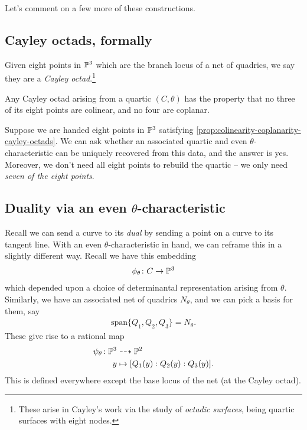 \documentclass[11pt]{amsart}
\begin{document}
Let's comment on a few more of these constructions.


\subsection{Cayley octads, formally}

\begin{definition}
Given eight points in $\P^3$ which are the branch locus of a net of quadrics, we say they are a \textit{Cayley octad}.\footnote{These arise in Cayley's work via the study of \textit{octadic surfaces}, being quartic surfaces with eight nodes.}
\end{definition}


\begin{proposition}
\label{prop:colinearity-coplanarity-cayley-octads}
Any Cayley octad arising from a quartic $(C,\theta)$ has the property that no three of its eight points are colinear, and no four are coplanar.
\end{proposition}

Suppose we are handed eight points in $\P^3$ satisfying \autoref{prop:colinearity-coplanarity-cayley-octads}. We can ask whether an associated quartic and even $\theta$-characteristic can be uniquely recovered from this data, and the answer is yes. Moreover, we don't need all eight points to rebuild the quartic -- we only need \textit{seven of the eight points}.

\subsection{Duality via an even \texorpdfstring{$\theta$}{theta}-characteristic}

Recall we can send a curve to its \textit{dual} by sending a point on a curve to its tangent line. With an even $\theta$-characteristic in hand, we can reframe this in a slightly different way. Recall we have this embedding
\begin{align*}
    \phi_\theta \colon C \to \P^3
\end{align*}
which depended upon a choice of determinantal representation arising from $\theta$. Similarly, we have an associated net of quadrics $N_\theta$, and we can pick a basis for them, say
\begin{align*}
    \text{span}\{Q_1,Q_2,Q_3\} = N_\theta.
\end{align*}
These give rise to a rational map
\begin{align*}
    \psi_\theta \colon \P^3 &\dashto \P^2 \\
    y &\mapsto [Q_1(y) : Q_2(y) : Q_3(y)].
\end{align*}
%
This is defined everywhere except the base locus of the net (at the Cayley octad).
\end{document}
